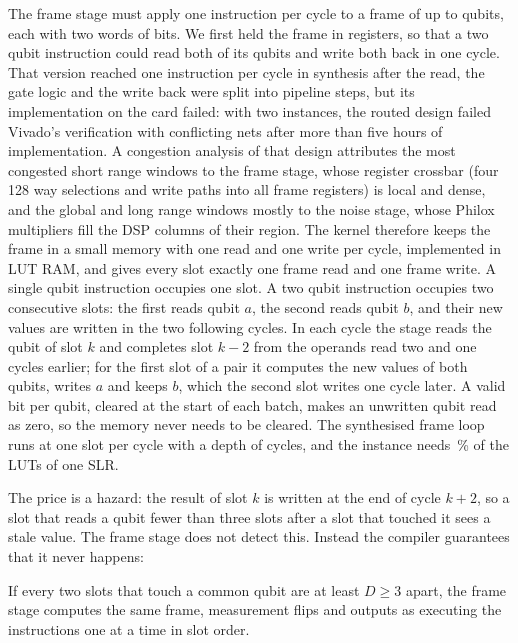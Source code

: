 The frame stage must apply one instruction per cycle to a frame of up to \NumQubitsMax{} qubits, each with two words
of \NumLanes{} bits. We first held the frame in registers, so that a two qubit instruction could read both of its
qubits and write both back in one cycle. That version reached one instruction per cycle in synthesis after the read,
the gate logic and the write back were split into pipeline steps, but its implementation on the card failed: with two instances, the
routed design failed Vivado's verification with conflicting nets after more than five hours of implementation. A
congestion analysis of that design attributes the most congested short range windows to the frame stage, whose
register crossbar (four 128 way selections and write paths into all frame registers) is local and dense, and the
global and long range windows mostly to the noise stage, whose Philox multipliers fill the DSP columns of their
region. The kernel therefore keeps the frame in a small memory with one read
and one write per cycle, implemented in LUT RAM, and gives every slot exactly one frame read and one frame write. A
single qubit instruction occupies one slot. A two qubit instruction occupies two consecutive slots: the first reads
qubit $a$, the second reads qubit $b$, and their new values are written in the two following cycles. In each cycle
the stage reads the qubit of slot $k$ and completes slot $k-2$ from the operands read two and one cycles earlier; for
the first slot of a pair it computes the new values of both qubits, writes $a$ and keeps $b$, which the second slot
writes one cycle later. A valid bit per qubit, cleared at the start of each batch, makes an unwritten qubit read as
zero, so the memory never needs to be cleared. The synthesised frame loop runs at one slot per cycle with a depth of
\NumDepthFrame{} cycles, and the instance needs \NumHlsLutSlr\,\% of the LUTs of one SLR.

The price is a hazard: the result of slot $k$ is written at the end of cycle $k+2$, so a slot that reads a qubit
fewer than three slots after a slot that touched it sees a stale value. The frame stage does not detect this. Instead
the compiler guarantees that it never happens:

\begin{proposition}\label{prop:schedule}
If every two slots that touch a common qubit are at least $D \ge 3$ apart, the frame stage computes the same frame,
measurement flips and outputs as executing the instructions one at a time in slot order.
\end{proposition}

